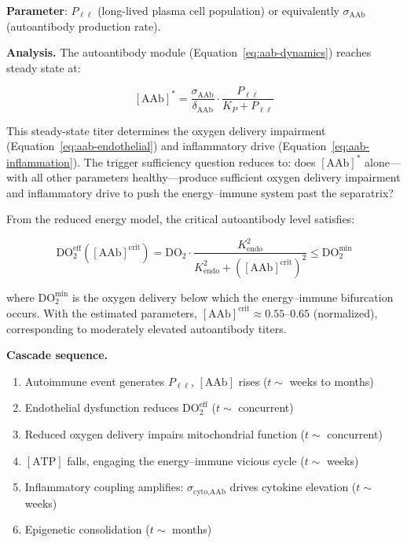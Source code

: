 \textbf{Parameter}: $P_{\ell\ell}$ (long-lived plasma cell population) or equivalently $\sigma_{\text{AAb}}$ (autoantibody production rate).

\textbf{Analysis.} The autoantibody module (Equation~\ref{eq:aab-dynamics}) reaches steady state at:

\begin{equation}
\label{eq:aab-steady-state}
[\text{AAb}]^* = \frac{\sigma_{\text{AAb}}}{\delta_{\text{AAb}}} \cdot \frac{P_{\ell\ell}}{K_P + P_{\ell\ell}}
\end{equation}

This steady-state titer determines the oxygen delivery impairment (Equation~\ref{eq:aab-endothelial}) and inflammatory drive (Equation~\ref{eq:aab-inflammation}). The trigger sufficiency question reduces to: does $[\text{AAb}]^*$ alone---with all other parameters healthy---produce sufficient oxygen delivery impairment and inflammatory drive to push the energy--immune system past the separatrix?

From the reduced energy model, the critical autoantibody level satisfies:

\begin{equation}
\label{eq:aab-critical}
\text{DO}_{2}^{\text{eff}}([\text{AAb}]^{\mathrm{crit}}) = \text{DO}_2 \cdot \frac{K_{\text{endo}}^2}{K_{\text{endo}}^2 + ([\text{AAb}]^{\mathrm{crit}})^2} \leq \text{DO}_{2}^{\mathrm{min}}
\end{equation}

where $\text{DO}_{2}^{\mathrm{min}}$ is the oxygen delivery below which the energy--immune bifurcation occurs. With the estimated parameters, $[\text{AAb}]^{\mathrm{crit}} \approx 0.55$--$0.65$ (normalized), corresponding to moderately elevated autoantibody titers.

\textbf{Cascade sequence.}
\begin{enumerate}
    \item Autoimmune event generates $P_{\ell\ell}$, $[\text{AAb}]$ rises ($t \sim$ weeks to months)
    \item Endothelial dysfunction reduces $\text{DO}_{2}^{\text{eff}}$ ($t \sim$ concurrent)
    \item Reduced oxygen delivery impairs mitochondrial function ($t \sim$ concurrent)
    \item $[\text{ATP}]$ falls, engaging the energy--immune vicious cycle ($t \sim$ weeks)
    \item Inflammatory coupling amplifies: $\sigma_{\text{cyto,AAb}}$ drives cytokine elevation ($t \sim$ weeks)
    \item Epigenetic consolidation ($t \sim$ months)
\end{enumerate}

